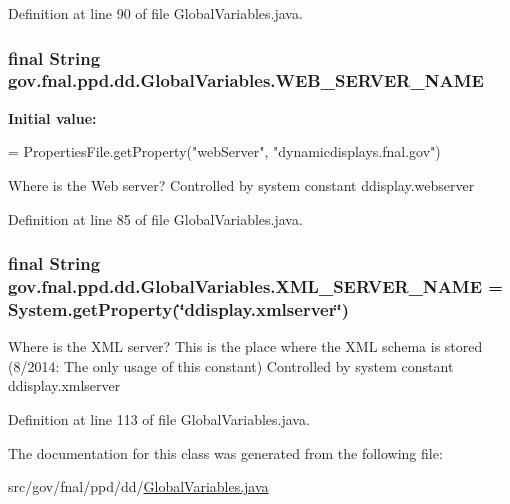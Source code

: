 Definition at line 90 of file Global\-Variables.\-java.

\hypertarget{classgov_1_1fnal_1_1ppd_1_1dd_1_1GlobalVariables_af5ffb15826513fabba402ec017edbc70}{
\subsubsection[{W\-E\-B\-\_\-\-S\-E\-R\-V\-E\-R\-\_\-\-N\-A\-M\-E}]{\setlength{\rightskip}{0pt plus 5cm}final String gov.\-fnal.\-ppd.\-dd.\-Global\-Variables.\-W\-E\-B\-\_\-\-S\-E\-R\-V\-E\-R\-\_\-\-N\-A\-M\-E\hspace{0.3cm}{\ttfamily [static]}}}\label{classgov_1_1fnal_1_1ppd_1_1dd_1_1GlobalVariables_af5ffb15826513fabba402ec017edbc70}
{\bfseries Initial value\-:}
\begin{DoxyCode}
= PropertiesFile.getProperty(\textcolor{stringliteral}{"webServer"},
            \textcolor{stringliteral}{"dynamicdisplays.fnal.gov"})
\end{DoxyCode}
Where is the Web server? Controlled by system constant ddisplay.\-webserver 

Definition at line 85 of file Global\-Variables.\-java.

\hypertarget{classgov_1_1fnal_1_1ppd_1_1dd_1_1GlobalVariables_a1b1eb1c9096380d09b968cd474e8bb86}{
\subsubsection[{X\-M\-L\-\_\-\-S\-E\-R\-V\-E\-R\-\_\-\-N\-A\-M\-E}]{\setlength{\rightskip}{0pt plus 5cm}final String gov.\-fnal.\-ppd.\-dd.\-Global\-Variables.\-X\-M\-L\-\_\-\-S\-E\-R\-V\-E\-R\-\_\-\-N\-A\-M\-E = System.\-get\-Property(\char`\"{}ddisplay.\-xmlserver\char`\"{})\hspace{0.3cm}{\ttfamily [static]}}}\label{classgov_1_1fnal_1_1ppd_1_1dd_1_1GlobalVariables_a1b1eb1c9096380d09b968cd474e8bb86}
Where is the X\-M\-L server? This is the place where the X\-M\-L schema is stored (8/2014\-: The only usage of this constant) Controlled by system constant ddisplay.\-xmlserver 

Definition at line 113 of file Global\-Variables.\-java.



The documentation for this class was generated from the following file\-:\begin{DoxyCompactItemize}
\item 
src/gov/fnal/ppd/dd/\hyperlink{GlobalVariables_8java}{Global\-Variables.\-java}\end{DoxyCompactItemize}
